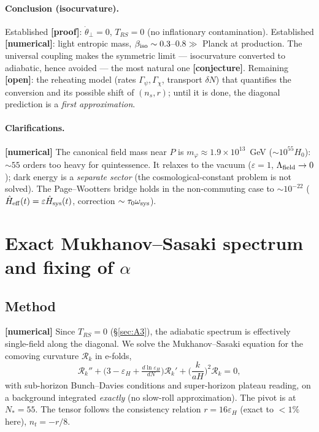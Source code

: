 \documentclass[11pt,a4paper]{article}
\newcommand{\st}[1]{\textbf{\textcolor{blue!45!black}{[#1]}}}
\begin{document}
\paragraph{Conclusion (isocurvature).} Established \st{proof}: $\dot\theta_\perp=0$, $T_{RS}=0$ (no inflationary contamination). Established \st{numerical}: light entropic mass, $\beta_{\rm iso}\sim0.3$--$0.8\gg$ Planck at production. The universal coupling makes the symmetric limit --- isocurvature converted to adiabatic, hence avoided --- the most natural one \st{conjecture}. Remaining \st{open}: the reheating model (rates $\Gamma_\psi,\Gamma_\chi$, transport $\delta N$) that quantifies the conversion and its possible shift of $(n_s,r)$; until it is done, the diagonal prediction is a \emph{first approximation}.

\paragraph{Clarifications.}
\st{numerical} The canonical field mass near $P$ is $m_\varphi\approx1.9\times10^{13}$~GeV ($\sim10^{55}H_0$): $\sim55$ orders too heavy for quintessence. It relaxes to the vacuum ($\varepsilon=1$, $\Lambda_{\rm field}\to0$); dark energy is a \emph{separate sector} (the cosmological-constant problem is not solved). The Page--Wootters bridge holds in the non-commuting case to $\sim10^{-22}$ ($\hat H_{\rm eff}(t)=\varepsilon\hat H_{\rm sys}(t)$, correction $\sim\tau_0\omega_{\rm sys}$).

\section{Exact Mukhanov--Sasaki spectrum and fixing of $\alpha$}\label{sec:A4}
\subsection{Method}
\st{numerical} Since $T_{RS}=0$ (\S\ref{sec:A3}), the adiabatic spectrum is effectively single-field along the diagonal. We solve the Mukhanov--Sasaki equation for the comoving curvature $\mathcal{R}_k$ in e-folds,
\begin{equation}
\mathcal{R}_k''+\big(3-\varepsilon_H+\tfrac{d\ln\varepsilon_H}{dN}\big)\mathcal{R}_k'+\Big(\frac{k}{aH}\Big)^2\mathcal{R}_k=0, \tag{9}
\end{equation}
with sub-horizon Bunch--Davies conditions and super-horizon plateau reading, on a background integrated \emph{exactly} (no slow-roll approximation). The pivot is at $N_*=55$. The tensor follows the consistency relation $r=16\varepsilon_H$ (exact to $<1\%$ here), $n_t=-r/8$.
\end{document}
